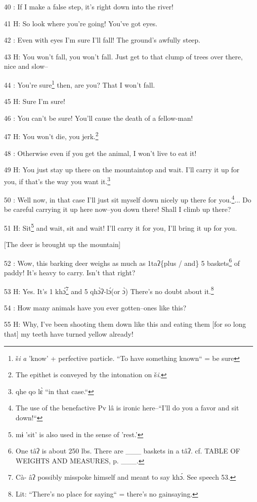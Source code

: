 40  : If I make a false step, it's right down into the river!

41 H: So look where you're going! You've got eyes.

42  : Even with eyes I'm sure I'll fall! The ground's awfully steep.

43 H: You won't fall, you won't fall. Just get to that clump of trees over there,
nice and slow--

44  : You're sure\footnote{š\emph{i} \emph{a} 'know' + perfective particle. ``To have something known`` = be sure} then, are you? That I won't fall.

45 H: Sure I'm sure!

46  : You can't be sure! You'll cause the death of a fellow-man!

47 H: You won't die, you jerk.\footnote{The epithet is conveyed by the intonation on š\emph{i}.}

48  : Otherwise even if you get the animal, I won't live to eat it!

49 H: You just stay up there on the mountaintop and wait. I'll carry it up for
you, if that's the way you want it.\footnote{qhe qo lɛ̀ ``in that case.``}

50  : Well now, in that case I'll just sit myself down nicely up there for you.\footnote{The use of the benefactive Pv lâ is ironic here--``I'll do you a favor and sit down!``}...
Do be careful carrying it up here now--you down there! Shall I climb up there?

51 H: Sit\footnote{mɨ 'sit' is also used in the sense of 'rest.'} and wait, sit and wait! I'll carry it for you, I'll bring it up for
you.

[The deer is brought up the mountain]

52  : Wow, this barking  deer weighs as much as 1taʔ\{plus / and\} 5 baskets\footnote{One tâʔ is about 250 lbs. There are \_\_\_ baskets in a tâʔ. cf. TABLE OF WEIGHTS AND MEASURES, p. \_\_\_.}
of paddy! It's heavy to carry. Isn't that right?

53 H: Yes. It's 1 khɔ́\footnote{Cà- âʔ possibly misspoke himself and meant to say khɔ́. See speech 53.} and 5 qhɔ̀ʔ-lɔ́(or ɔ̀) There's no doubt about
it.\footnote{Lit: ``There's no place for saying`` = there's no gainsaying.}

54  : How many animals have you ever gotten--ones like this?

55 H: Why, I've been shooting them down like this and eating them [for so long
that] my teeth have turned yellow already!

